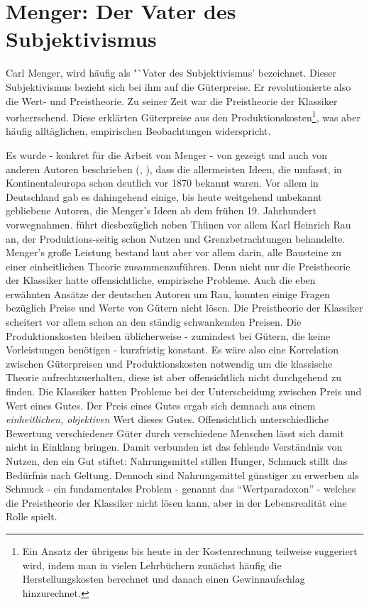 \section{Menger: Der Vater des Subjektivismus}
\label{Wiener Schule}

Carl Menger, wird häufig als "`Vater des Subjektivismus' bezeichnet. Dieser Subjektivismus bezieht sich bei ihm auf die Güterpreise. Er revolutionierte also die Wert- und Preistheorie. Zu seiner Zeit war die Preistheorie der Klassiker vorherrschend. Diese erklärten Güterpreise aus den Produktionskosten\footnote{Ein Ansatz der übrigens bis heute in der Kostenrechnung teilweise suggeriert wird, indem man in vielen Lehrbüchern zunächst häufig die Herstellungskosten berechnet und danach einen Gewinnaufschlag hinzurechnet.}, was aber häufig alltäglichen, empirischen Beobachtungen widerspricht. 

Es wurde - konkret für die Arbeit von Menger - von \textcite{Streissler1990} gezeigt und auch von anderen Autoren beschrieben (\textcite{Blaug1973}, \textcite{Ekelund2002}), dass die allermeisten Ideen, die \textcite{Menger1871} umfasst, in Kontinentaleuropa schon deutlich vor 1870 bekannt waren. Vor allem in Deutschland gab es dahingehend einige, bis heute weitgehend unbekannt gebliebene Autoren, die Menger's Ideen ab dem frühen 19. Jahrhundert vorwegnahmen. \textcite[S. 159]{Blaug2001} führt diesbezüglich neben Thünen vor allem Karl Heinrich Rau an, der  Produktions-seitig schon Nutzen und Grenzbetrachtungen behandelte. Menger's große Leistung bestand laut \textcite[S. 295]{Rosner2012} aber vor allem darin, alle Bausteine zu einer einheitlichen Theorie zusammenzuführen. Denn nicht nur die Preistheorie der Klassiker hatte offensichtliche, empirische Probleme. Auch die eben erwähnten Ansätze der deutschen Autoren um Rau, konnten einige Fragen bezüglich Preise und Werte von Gütern nicht lösen. Die Preistheorie der Klassiker scheitert vor allem schon an den ständig schwankenden Preisen. Die Produktionskosten bleiben üblicherweise - zumindest bei Gütern, die keine Vorleistungen benötigen - kurzfristig konstant. Es wäre also eine Korrelation zwischen Güterpreisen und Produktionskosten notwendig um die klassische Theorie aufrechtzuerhalten, diese ist aber offensichtlich nicht durchgehend zu finden. Die Klassiker hatten Probleme bei der Unterscheidung zwischen Preis und Wert eines Gutes. Der Preis eines Gutes ergab sich demnach aus einem \textit{einheitlichen, objektiven} Wert dieses Gutes. Offensichtlich unterschiedliche Bewertung verschiedener Güter durch verschiedene Menschen lässt sich damit nicht in Einklang bringen. Damit verbunden ist das fehlende Verständnis von Nutzen, den ein Gut stiftet: Nahrungsmittel stillen Hunger, Schmuck stillt das Bedürfnis nach Geltung. Dennoch sind Nahrungsmittel günstiger zu erwerben als Schmuck - ein fundamentales Problem - genannt das "`Wertparadoxon"' - welches die Preistheorie der Klassiker nicht lösen kann, aber in der Lebensrealität eine Rolle spielt.


